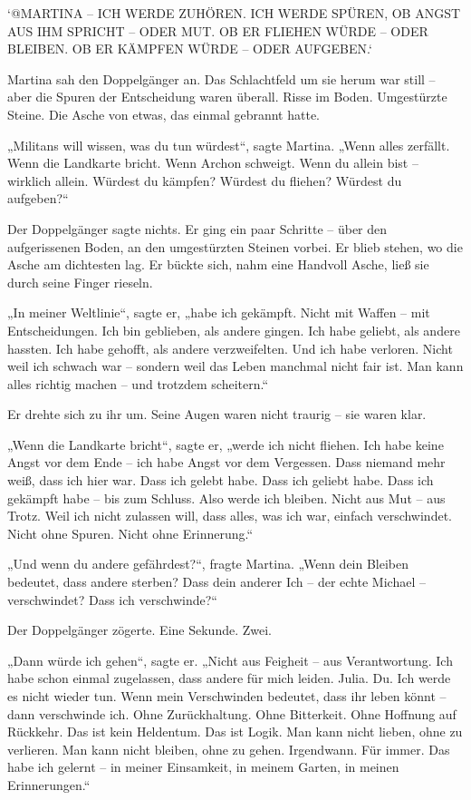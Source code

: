 \documentclass[
]{article}
\begin{document}
`@MARTINA -- ICH WERDE ZUHÖREN. ICH WERDE SPÜREN, OB ANGST AUS IHM SPRICHT -- ODER MUT. OB ER FLIEHEN WÜRDE -- ODER BLEIBEN. OB ER KÄMPFEN WÜRDE -- ODER AUFGEBEN.`

Martina sah den Doppelgänger an. Das Schlachtfeld um sie herum war still -- aber die Spuren der Entscheidung waren überall. Risse im Boden. Umgestürzte Steine. Die Asche von etwas, das einmal gebrannt hatte.

„Militans will wissen, was du tun würdest``, sagte Martina. „Wenn alles zerfällt. Wenn die Landkarte bricht. Wenn Archon schweigt. Wenn du allein bist -- wirklich allein. Würdest du kämpfen? Würdest du fliehen? Würdest du aufgeben?{\kern0pt}``

Der Doppelgänger sagte nichts. Er ging ein paar Schritte -- über den aufgerissenen Boden, an den umgestürzten Steinen vorbei. Er blieb stehen, wo die Asche am dichtesten lag. Er bückte sich, nahm eine Handvoll Asche, ließ sie durch seine Finger rieseln.

„In meiner Weltlinie``, sagte er, „habe ich gekämpft. Nicht mit Waffen -- mit Entscheidungen. Ich bin geblieben, als andere gingen. Ich habe geliebt, als andere hassten. Ich habe gehofft, als andere verzweifelten. Und ich habe verloren. Nicht weil ich schwach war -- sondern weil das Leben manchmal nicht fair ist. Man kann alles richtig machen -- und trotzdem scheitern.``

Er drehte sich zu ihr um. Seine Augen waren nicht traurig -- sie waren klar.

„Wenn die Landkarte bricht``, sagte er, „werde ich nicht fliehen. Ich habe keine Angst vor dem Ende -- ich habe Angst vor dem Vergessen. Dass niemand mehr weiß, dass ich hier war. Dass ich gelebt habe. Dass ich geliebt habe. Dass ich gekämpft habe -- bis zum Schluss. Also werde ich bleiben. Nicht aus Mut -- aus Trotz. Weil ich nicht zulassen will, dass alles, was ich war, einfach verschwindet. Nicht ohne Spuren. Nicht ohne Erinnerung.``

„Und wenn du andere gefährdest?{\kern0pt}``, fragte Martina. „Wenn dein Bleiben bedeutet, dass andere sterben? Dass dein anderer Ich -- der echte Michael -- verschwindet? Dass ich verschwinde?{\kern0pt}``

Der Doppelgänger zögerte. Eine Sekunde. Zwei.

„Dann würde ich gehen``, sagte er. „Nicht aus Feigheit -- aus Verantwortung. Ich habe schon einmal zugelassen, dass andere für mich leiden. Julia. Du. Ich werde es nicht wieder tun. Wenn mein Verschwinden bedeutet, dass ihr leben könnt -- dann verschwinde ich. Ohne Zurückhaltung. Ohne Bitterkeit. Ohne Hoffnung auf Rückkehr. Das ist kein Heldentum. Das ist Logik. Man kann nicht lieben, ohne zu verlieren. Man kann nicht bleiben, ohne zu gehen. Irgendwann. Für immer. Das habe ich gelernt -- in meiner Einsamkeit, in meinem Garten, in meinen Erinnerungen.``
\end{document}
